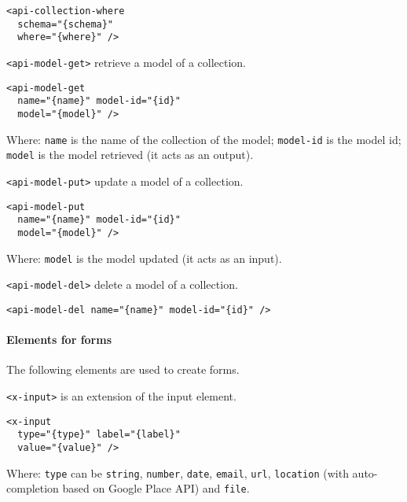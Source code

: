 \begin{lstlisting}[language=HTML5]
<api-collection-where 
  schema="{schema}"
  where="{where}" />
\end{lstlisting}

\texttt{<api-model-get>} retrieve a model of a collection. 

\begin{lstlisting}[language=HTML5]
<api-model-get 
  name="{name}" model-id="{id}" 
  model="{model}" />
\end{lstlisting}

Where: 
\texttt{name} is the name of the collection of the model; 
\texttt{model-id} is the model id; 
\texttt{model} is the model retrieved (it acts as an output).

\texttt{<api-model-put>} update a model of a collection. 

\begin{lstlisting}[language=HTML5]
<api-model-put 
  name="{name}" model-id="{id}" 
  model="{model}" />
\end{lstlisting}

Where: 
\texttt{model} is the model updated (it acts as an input).

\vspace{0.2cm}

\texttt{<api-model-del>} delete a model of a collection. 

\begin{lstlisting}[language=HTML5]
<api-model-del name="{name}" model-id="{id}" />
\end{lstlisting}

\paragraph{Elements for forms}
The following elements are used to create forms. 

\vspace{0.2cm}

\texttt{<x-input>} is an extension of the input element. 

\begin{lstlisting}[language=HTML5]
<x-input 
  type="{type}" label="{label}"
  value="{value}" />
\end{lstlisting}

Where: 
\texttt{type} can be \texttt{string}, \texttt{number}, \texttt{date}, \texttt{email}, \texttt{url}, \texttt{location} (with auto-completion based on Google Place API) and \texttt{file}.

